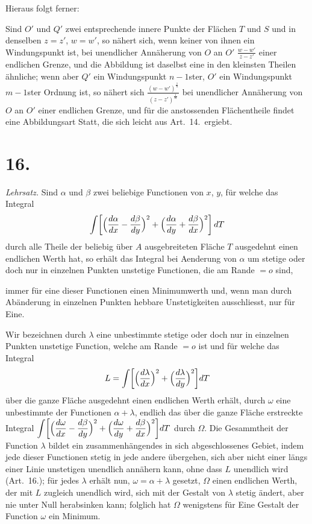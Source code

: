 \documentclass{article}
\begin{document}
Hieraus folgt ferner:

Sind $O'$ und $Q'$ zwei entsprechende innere Punkte der Flächen $T$ und $S$ und in denselben $z = z'$, $w = w'$, so nähert sich, wenn keiner von ihnen ein Windungspunkt ist, bei unendlicher Annäherung von $O$ an $O'$ $\frac{w - w'}{z - z'}$ einer endlichen Grenze, und die Abbildung ist daselbst eine in den kleinsten Theilen ähnliche; wenn aber $Q'$ ein Windungspunkt $n-1$ster, $O'$ ein Windungspunkt $m-1$ster Ordnung ist, so nähert sich $\frac{(w - w')^{\frac{1}{n}}}{(z - z')^{\frac{1}{m}}}$ bei unendlicher Annäherung von $O$ an $O'$ einer endlichen Grenze, und für die anstossenden Flächentheile findet eine Abbildungsart Statt, die sich leicht aus Art.~14.\ ergiebt.

\section*{16.}

\emph{Lehrsatz.} Sind $\alpha$ und $\beta$ zwei beliebige Functionen von $x$, $y$, für welche das Integral
\[
\int \biggl[\Bigl(\frac{d\alpha}{dx} - \frac{d\beta}{dy}\Bigr)^2 + \Bigl(\frac{d\alpha}{dy} + \frac{d\beta}{dx}\Bigr)^2\biggr]\,dT
\]
durch alle Theile der beliebig über $A$ ausgebreiteten Fläche $T$ ausgedehnt einen endlichen Werth hat, so erhält das Integral bei Aenderung von $\alpha$ um stetige oder doch nur in einzelnen Punkten unstetige Functionen, die am Rande $= o$ sind,

immer für eine dieser Functionen einen Minimumwerth und, wenn man durch Abänderung in einzelnen Punkten hebbare Unstetigkeiten ausschliesst, nur für Eine.

Wir bezeichnen durch $\lambda$ eine unbestimmte stetige oder doch nur in einzelnen Punkten unstetige Function, welche am Rande $= o$ ist und für welche das Integral
\[
L = \int \biggl[\Bigl(\frac{d\lambda}{dx}\Bigr)^2 + \Bigl(\frac{d\lambda}{dy}\Bigr)^2\biggr] dT
\]
über die ganze Fläche ausgedehnt einen endlichen Werth erhält, durch $\omega$ eine unbestimmte der Functionen $\alpha + \lambda$, endlich das über die ganze Fläche erstreckte Integral $\displaystyle\int \biggl[\Bigl(\frac{d\omega}{dx} - \frac{d\beta}{dy}\Bigr)^2 + \Bigl(\frac{d\omega}{dy} + \frac{d\beta}{dx}\Bigr)^2\biggr] dT$ durch $\varOmega$. Die Gesammtheit der Function $\lambda$ bildet ein zusammenhängendes in sich abgeschlossenes Gebiet, indem jede dieser Functionen stetig in jede andere übergehen, sich aber nicht einer längs einer Linie unstetigen unendlich annähern kann, ohne dass $L$ unendlich wird (Art.~16.); für jedes $\lambda$ erhält nun, $\omega = \alpha + \lambda$ gesetzt, $\varOmega$ einen endlichen Werth, der mit $L$ zugleich unendlich wird, sich mit der Gestalt von $\lambda$ stetig ändert, aber nie unter Null herabsinken kann; folglich hat $\varOmega$ wenigstens für Eine Gestalt der Function $\omega$ ein Minimum.
\end{document}
